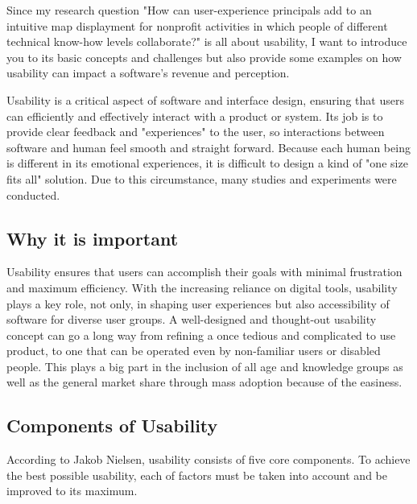 \Author{\daAuthorTwo}

Since my research question "How can user-experience principals add to an intuitive map displayment for nonprofit activities in which people of different technical know-how levels collaborate?" is all about usability, I want to introduce you to its basic concepts and challenges but also provide some examples on how usability can impact a software's revenue and perception.

\blankLine

Usability is a critical aspect of software and interface design, ensuring that users can efficiently and effectively interact with a product or system. Its job is to provide clear feedback and "experiences" to the user, so interactions between software and human feel smooth and straight forward. Because each human being is different in its emotional experiences, it is difficult to design a kind of "one size fits all" solution. Due to this circumstance, many studies and experiments were conducted. \autocite{Paul:Usability101}

\subsection{Why it is important}

Usability ensures that users can accomplish their goals with minimal frustration and maximum efficiency. With the increasing reliance on digital tools, usability plays a key role, not only, in shaping user experiences but also accessibility of software for diverse user groups. A well-designed and thought-out usability concept can go a long way from refining a once tedious and complicated to use product, to one that can be operated even by non-familiar users or disabled people. This plays a big part in the inclusion of all age and knowledge groups as well as the general market share through mass adoption because of the easiness.

\subsection{Components of Usability}

According to Jakob Nielsen, usability consists of five core components. To achieve the best possible usability, each of factors must be taken into account and be improved to its maximum.


